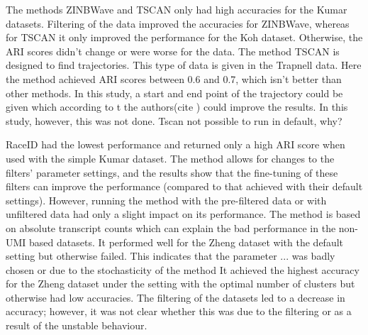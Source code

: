 \documentclass[11pt, a4paper]{article}\usepackage[]{graphicx}\usepackage[]{color}
\begin{document}
The methods ZINBWave and TSCAN only had high accuracies for the Kumar datasets. Filtering of the data improved the accuracies for ZINBWave, whereas for TSCAN it only improved the performance for the Koh dataset. Otherwise, the ARI scores didn't change or were worse for the data. The method TSCAN is designed to find trajectories. This type of data is given in the Trapnell data. Here the method achieved ARI scores between 0.6 and 0.7, which isn't better than other methods. In this study, a start and end point of the trajectory could be given which according to t the authors(cite ) could improve the results. In this study, however, this was not done. Tscan not possible to run in default, why?

RaceID had the lowest performance and returned only a high ARI score when used with the simple Kumar dataset. The method allows for changes to the filters’ parameter settings, and the results show that the fine-tuning of these filters can improve the performance (compared to that achieved with their default settings). However, running the method with the pre-filtered data or with unfiltered data had only a slight impact on its performance. The method is based on absolute transcript counts which can explain the bad performance in the non-UMI based datasets. It performed well for the Zheng dataset with the default setting but otherwise failed. This indicates that the parameter ... was badly chosen or due to the stochasticity of the method
It achieved the highest accuracy for the Zheng dataset under the setting with the optimal number of clusters but otherwise had low accuracies. The filtering of the datasets led to a decrease in accuracy; however, it was not clear whether this was due to the filtering or as a result of the unstable behaviour. 
\end{document}

